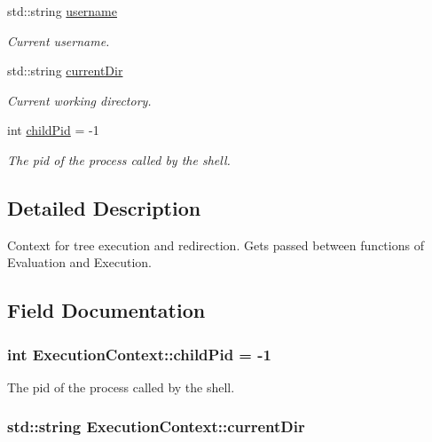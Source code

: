 \begin{DoxyCompactItemize}
std\+::string \hyperlink{structExecutionContext_a6c1bbd4dcfc82e4902c4382af69ab6d9}{username}
\begin{DoxyCompactList}\small\item\em Current username. \end{DoxyCompactList}\item 
std\+::string \hyperlink{structExecutionContext_ad3a0ccfbff4fe1b7b0f5ced3a58dca32}{current\+Dir}
\begin{DoxyCompactList}\small\item\em Current working directory. \end{DoxyCompactList}\item 
int \hyperlink{structExecutionContext_a625cc2ed3ed64f3ac50165818c300943}{child\+Pid} = -\/1
\begin{DoxyCompactList}\small\item\em The pid of the process called by the shell. \end{DoxyCompactList}\end{DoxyCompactItemize}


\subsection{Detailed Description}
Context for tree execution and redirection. Gets passed between functions of Evaluation and Execution. 

\subsection{Field Documentation}
\subsubsection[{\texorpdfstring{child\+Pid}{childPid}}]{\setlength{\rightskip}{0pt plus 5cm}int Execution\+Context\+::child\+Pid = -\/1}\hypertarget{structExecutionContext_a625cc2ed3ed64f3ac50165818c300943}{}\label{structExecutionContext_a625cc2ed3ed64f3ac50165818c300943}


The pid of the process called by the shell. 

\subsubsection[{\texorpdfstring{current\+Dir}{currentDir}}]{\setlength{\rightskip}{0pt plus 5cm}std\+::string Execution\+Context\+::current\+Dir}\hypertarget{structExecutionContext_ad3a0ccfbff4fe1b7b0f5ced3a58dca32}{}\label{structExecutionContext_ad3a0ccfbff4fe1b7b0f5ced3a58dca32}


